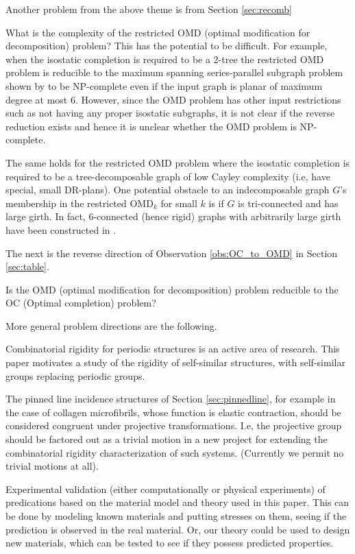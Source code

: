 Another problem from the above theme is from Section \ref{sec:recomb}
\begin{openproblem}
    What is the complexity of the restricted OMD (optimal modification for decomposition) problem? This has the potential to be difficult. For example, when the isostatic completion is required to be a 2-tree the restricted OMD problem is reducible to the maximum spanning series-parallel subgraph problem shown by \cite{cai1993spanning} to be NP-complete even if the input graph is planar of maximum degree at most 6. However, since the OMD problem has other input restrictions such as not having any proper isostatic subgraphs, it is not clear if the reverse reduction exists and hence it is unclear whether the OMD problem is NP-complete.

    The same holds for the restricted OMD problem where the isostatic completion is required to be a tree-decomposable graph of low Cayley complexity (i.e, have special, small DR-plans). One potential obstacle to an indecomposable graph $G$'s membership in the restricted OMD$_k$ for small $k$ is if $G$ is tri-connected and has large girth. In fact, 6-connected (hence rigid) graphs with arbitrarily large girth have been constructed in \cite{servatius2000rigidity}.
\end{openproblem}

The next is the reverse direction of Observation \ref{obs:OC_to_OMD} in Section \ref{sec:table}.
\begin{openproblem}
    Is the OMD (optimal modification for decomposition) problem reducible to the OC (Optimal completion) problem?
\end{openproblem}

More general problem directions are the following.
\begin{openproblem}
    Combinatorial rigidity for periodic structures is an active area of research. This paper motivates a study of the rigidity of self-similar structures, with self-similar groups replacing periodic groups.
\end{openproblem}

\begin{openproblem}
    The pinned line incidence structures of Section \ref{sec:pinnedline}, for example in the case of collagen microfibrils, whose function is elastic contraction, should be considered congruent under projective transformations. I.e, the projective group should be factored out as a trivial motion in a new project for extending the combinatorial rigidity characterization of such systems. (Currently we permit no trivial motions at all).
\end{openproblem}

\begin{openproblem}
    Experimental validation (either computationally or physical experiments) of predications based on the material model and theory used in this paper. This can be done by modeling known materials and putting stresses on them, seeing if the prediction is observed in the real material. Or, our theory could be used to design new materials, which can be tested to see if they possess predicted properties.
\end{openproblem}
